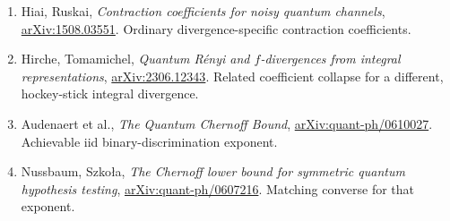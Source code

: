 \documentclass[10pt,a4paper]{article}
\begin{document}
\begin{enumerate}
\item Hiai, Ruskai, \emph{Contraction coefficients for noisy quantum channels}, \href{https://arxiv.org/abs/1508.03551}{arXiv:1508.03551}. Ordinary divergence-specific contraction coefficients.
\item Hirche, Tomamichel, \emph{Quantum R\'enyi and $f$-divergences from integral representations}, \href{https://arxiv.org/html/2306.12343}{arXiv:2306.12343}. Related coefficient collapse for a different, hockey-stick integral divergence.
\item Audenaert et al., \emph{The Quantum Chernoff Bound}, \href{https://arxiv.org/abs/quant-ph/0610027}{arXiv:quant-ph/0610027}. Achievable iid binary-discrimination exponent.
\item Nussbaum, Szko\l a, \emph{The Chernoff lower bound for symmetric quantum hypothesis testing}, \href{https://arxiv.org/abs/quant-ph/0607216}{arXiv:quant-ph/0607216}. Matching converse for that exponent.
\end{enumerate}
\end{document}
